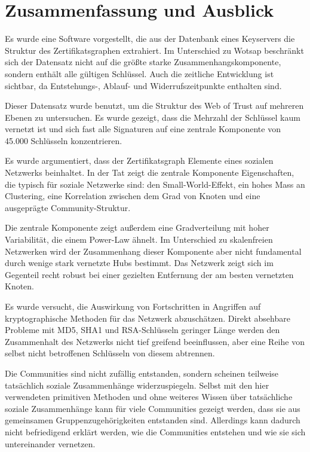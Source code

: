 
\chapter{Zusammenfassung und Ausblick}
\label{ch:Zusammenfassung}

Es wurde eine Software vorgestellt, die aus der Datenbank eines
Keyservers die Struktur des Zertifikatsgraphen extrahiert. Im
Unterschied zu Wotsap beschränkt sich der Datensatz nicht auf die
größte starke Zusammenhangskomponente, sondern enthält alle
g\"ultigen Schlüssel. Auch die zeitliche Entwicklung ist sichtbar, da
Entstehungs-, Ablauf- und Widerrufszeitpunkte enthalten sind.

Dieser Datensatz wurde benutzt, um die Struktur des Web of Trust auf
mehreren Ebenen zu untersuchen. Es wurde gezeigt, dass die Mehrzahl
der Schlüssel kaum vernetzt ist und sich fast alle Signaturen auf
eine zentrale Komponente von 45.000 Schlüsseln konzentrieren. 

Es wurde argumentiert, dass der Zertifikatsgraph Elemente eines
sozialen Netzwerks beinhaltet. In der Tat zeigt die zentrale
Komponente Eigenschaften, die typisch für soziale Netzwerke sind:
den Small-World-Effekt, ein hohes Mass an Clustering, eine Korrelation
zwischen dem Grad von Knoten und eine ausgeprägte
Community-Struktur.

Die zentrale Komponente zeigt au{\ss}erdem eine Gradverteilung mit
hoher Variabilit\"at, die einem Power-Law \"ahnelt. Im Unterschied zu
skalenfreien Netzwerken wird der Zusammenhang dieser Komponente aber
nicht fundamental durch wenige stark vernetzte Hubs bestimmt. Das
Netzwerk zeigt sich im Gegenteil recht robust bei einer gezielten
Entfernung der am besten vernetzten Knoten.

Es wurde versucht, die Auswirkung von Fortschritten in Angriffen auf
kryptographische Methoden für das Netzwerk abzuschätzen. Direkt
absehbare Probleme mit MD5, SHA1 und RSA-Schlüsseln geringer Länge
werden den Zusammenhalt des Netzwerks nicht tief greifend beeinflussen,
aber eine Reihe von selbst nicht betroffenen Schlüsseln von diesem
abtrennen.

Die Communities sind nicht zufällig entstanden, sondern scheinen
teilweise tatsächlich soziale Zusammenhänge
widerzuspiegeln. Selbst mit den hier verwendeten primitiven Methoden
und ohne weiteres Wissen über tatsächliche soziale Zusammenhänge
kann für viele Communities gezeigt werden, dass sie aus gemeinsamen
Gruppenzugehörigkeiten entstanden sind. Allerdings kann dadurch
nicht befriedigend erklärt werden, wie die Communities entstehen
und wie sie sich untereinander vernetzen.

